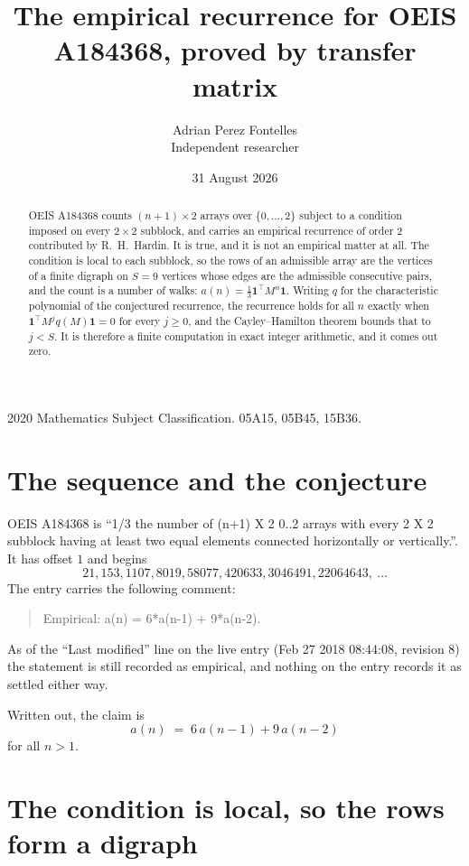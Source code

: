 \documentclass[11pt,a4paper]{article}
\title{The empirical recurrence for OEIS A184368, proved by transfer matrix}
\author{Adrian Perez Fontelles\\ \small Independent researcher}
\date{31 August 2026}
\theoremstyle{plain}
\theoremstyle{definition}
\begin{document}
\maketitle

\begin{abstract}
OEIS A184368 counts $(n+1)\times2$ arrays over $\{0,\dots,2\}$ subject to a condition imposed on
every $2\times2$ subblock, and carries an empirical recurrence of order $2$ contributed
by R.~H.~Hardin. It is true, and it is not an empirical matter at all. The condition is local
to each subblock, so the rows of an admissible array are the vertices of a finite digraph
on $S=9$ vertices whose edges are the admissible consecutive pairs, and the count is a
number of walks: $a(n)=\tfrac1{3}\mathbf{1}^{\!\top}M^{n}\mathbf{1}$. Writing $q$
for the characteristic polynomial of the conjectured recurrence, the recurrence holds for all
$n$ exactly when $\mathbf{1}^{\!\top}M^{j}q(M)\mathbf{1}=0$ for every $j\ge0$, and the
Cayley--Hamilton theorem bounds that to $j<S$. It is therefore a finite computation in exact
integer arithmetic, and it comes out zero.
\end{abstract}

\noindent\small 2020 Mathematics Subject Classification. 05A15, 05B45, 15B36.\normalsize

\section{The sequence and the conjecture}

OEIS A184368 is ``1/3 the number of (n+1) X 2 0..2 arrays with every 2 X 2 subblock having at least two equal elements connected horizontally or vertically.''. It has offset $1$ and begins
\[
21, 153, 1107, 8019, 58077, 420633, 3046491, 22064643,\ \dots
\]
The entry carries the following comment:
\begin{quote}\small
Empirical: a(n) = 6*a(n-1) + 9*a(n-2).
\end{quote}
As of the ``Last modified'' line on the live entry (Feb 27 2018 08:44:08, revision 8) the statement is
still recorded as empirical, and nothing on the entry records it as settled either way.

Written out, the claim is
\begin{equation}\label{eq:conj}
a(n)\;=\;6\,a(n-1) + 9\,a(n-2)
\end{equation}
for all $n>1$.

\section{The condition is local, so the rows form a digraph}
\end{document}
